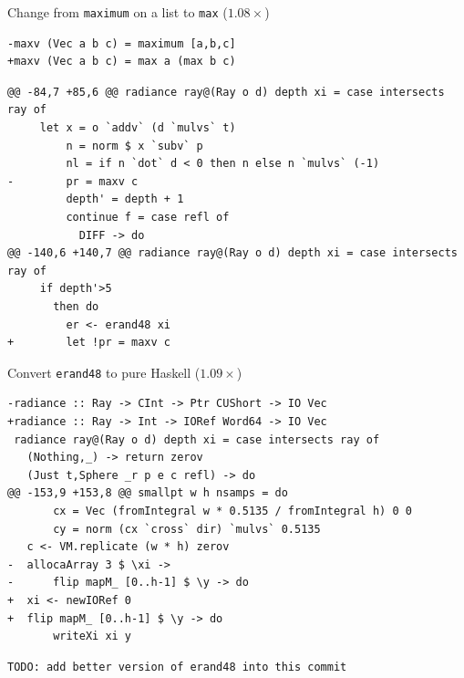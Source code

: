 \documentclass[8pt]{beamer}
\begin{document}

\begin{frame}[fragile]{Change from \texttt{maximum} on a list to \texttt{max} ($1.08\times$)}
\begin{verbatim}
-maxv (Vec a b c) = maximum [a,b,c]
+maxv (Vec a b c) = max a (max b c)
\end{verbatim}

\begin{verbatim}
@@ -84,7 +85,6 @@ radiance ray@(Ray o d) depth xi = case intersects ray of
     let x = o `addv` (d `mulvs` t)
         n = norm $ x `subv` p
         nl = if n `dot` d < 0 then n else n `mulvs` (-1)
-        pr = maxv c
         depth' = depth + 1
         continue f = case refl of
           DIFF -> do
@@ -140,6 +140,7 @@ radiance ray@(Ray o d) depth xi = case intersects ray of
     if depth'>5
       then do
         er <- erand48 xi
+        let !pr = maxv c
\end{verbatim}

\end{frame}



\begin{frame}[fragile]{Convert \texttt{erand48} to pure Haskell ($1.09\times$)}
\begin{verbatim}
-radiance :: Ray -> CInt -> Ptr CUShort -> IO Vec
+radiance :: Ray -> Int -> IORef Word64 -> IO Vec
 radiance ray@(Ray o d) depth xi = case intersects ray of
   (Nothing,_) -> return zerov
   (Just t,Sphere _r p e c refl) -> do
@@ -153,9 +153,8 @@ smallpt w h nsamps = do
       cx = Vec (fromIntegral w * 0.5135 / fromIntegral h) 0 0
       cy = norm (cx `cross` dir) `mulvs` 0.5135
   c <- VM.replicate (w * h) zerov
-  allocaArray 3 $ \xi ->
-      flip mapM_ [0..h-1] $ \y -> do
+  xi <- newIORef 0
+  flip mapM_ [0..h-1] $ \y -> do
       writeXi xi y
\end{verbatim}

\begin{verbatim}
TODO: add better version of erand48 into this commit
\end{verbatim}
\end{frame}
\end{document}
